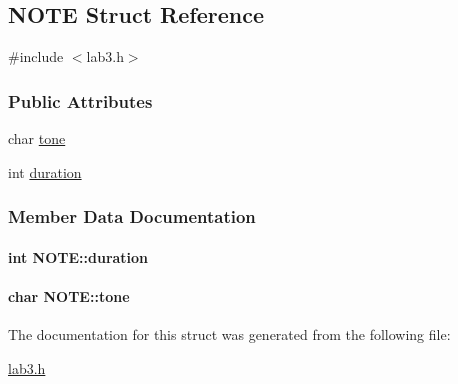 \hypertarget{structNOTE}{\subsection{N\+O\+T\+E Struct Reference}
\label{structNOTE}
}


{\ttfamily \#include $<$lab3.\+h$>$}

\subsubsection*{Public Attributes}
\begin{DoxyCompactItemize}
\item 
char \hyperlink{structNOTE_ae03dbb1306465fe61ec10da05fa5782e}{tone}
\item 
int \hyperlink{structNOTE_a258adf07267f95ab9630b33bad1b2fe2}{duration}
\end{DoxyCompactItemize}


\subsubsection{Member Data Documentation}
\hypertarget{structNOTE_a258adf07267f95ab9630b33bad1b2fe2}{
\paragraph[{duration}]{\setlength{\rightskip}{0pt plus 5cm}int N\+O\+T\+E\+::duration}}\label{structNOTE_a258adf07267f95ab9630b33bad1b2fe2}
\hypertarget{structNOTE_ae03dbb1306465fe61ec10da05fa5782e}{
\paragraph[{tone}]{\setlength{\rightskip}{0pt plus 5cm}char N\+O\+T\+E\+::tone}}\label{structNOTE_ae03dbb1306465fe61ec10da05fa5782e}


The documentation for this struct was generated from the following file\+:\begin{DoxyCompactItemize}
\item 
\hyperlink{lab3_8h}{lab3.\+h}\end{DoxyCompactItemize}
